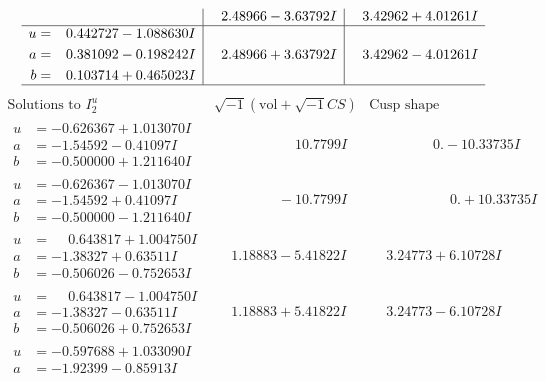 \documentclass[1p]{elsarticle_modified}
\theoremstyle{definition}
\newcommand{\I}{\sqrt{-1}}
\begin{document}
$$\begin{array}{c|c|c}
 & \phantom{-}2.48966 - 3.63792 I & \phantom{-}3.42962 + 4.01261 I \\ \hline\begin{aligned}
u &= \phantom{-}0.442727 - 1.088630 I \\
a &= \phantom{-}0.381092 - 0.198242 I \\
b &= \phantom{-}0.103714 + 0.465023 I\end{aligned}
 & \phantom{-}2.48966 + 3.63792 I & \phantom{-}3.42962 - 4.01261 I\\
 \hline 
 \end{array}$$\newpage$$\begin{array}{c|c|c}  
\text{Solutions to }I^u_{2}& \I (\text{vol} + \sqrt{-1}CS) & \text{Cusp shape}\\
 \hline 
\begin{aligned}
u &= -0.626367 + 1.013070 I \\
a &= -1.54592 - 0.41097 I \\
b &= -0.500000 + 1.211640 I\end{aligned}
 & \phantom{-0.000000 -}10.7799 I & \phantom{-0.000000 } 0. - 10.33735 I \\ \hline\begin{aligned}
u &= -0.626367 - 1.013070 I \\
a &= -1.54592 + 0.41097 I \\
b &= -0.500000 - 1.211640 I\end{aligned}
 & \phantom{-0.000000 } -10.7799 I & \phantom{-0.000000 -}0. + 10.33735 I \\ \hline\begin{aligned}
u &= \phantom{-}0.643817 + 1.004750 I \\
a &= -1.38327 + 0.63511 I \\
b &= -0.506026 - 0.752653 I\end{aligned}
 & \phantom{-}1.18883 - 5.41822 I & \phantom{-}3.24773 + 6.10728 I \\ \hline\begin{aligned}
u &= \phantom{-}0.643817 - 1.004750 I \\
a &= -1.38327 - 0.63511 I \\
b &= -0.506026 + 0.752653 I\end{aligned}
 & \phantom{-}1.18883 + 5.41822 I & \phantom{-}3.24773 - 6.10728 I \\ \hline\begin{aligned}
u &= -0.597688 + 1.033090 I \\
a &= -1.92399 - 0.85913 I \\

\end{aligned}
\end{array}$$
\end{document}

